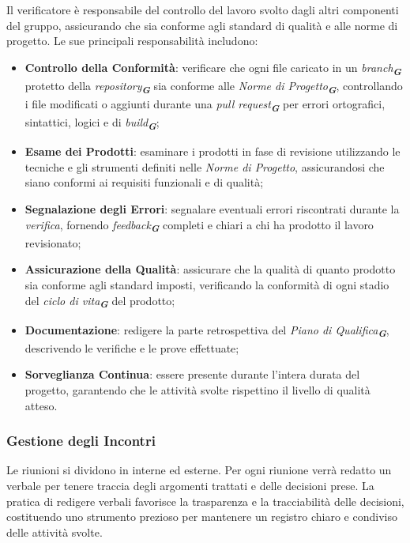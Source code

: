 Il verificatore è responsabile del controllo del lavoro svolto dagli altri componenti del gruppo, assicurando che sia conforme agli standard di qualità e alle norme di progetto. 
Le sue principali responsabilità includono:
\begin{itemize}
    \item \textbf{Controllo della Conformità}: verificare che ogni file caricato in un \emph{branch}\textsubscript{\textit{\textbf{G}}} protetto della \emph{repository}\textsubscript{\textit{\textbf{G}}} sia conforme alle \emph{Norme di Progetto}\textsubscript{\textit{\textbf{G}}}, controllando i file modificati o aggiunti durante una \emph{pull request}\textsubscript{\textit{\textbf{G}}} per errori ortografici, sintattici, logici e di \emph{build}\textsubscript{\textit{\textbf{G}}};
    \item \textbf{Esame dei Prodotti}: esaminare i prodotti in fase di revisione utilizzando le tecniche e gli strumenti definiti nelle \emph{Norme di Progetto}, assicurandosi che siano conformi ai requisiti funzionali e di qualità;
    \item \textbf{Segnalazione degli Errori}: segnalare eventuali errori riscontrati durante la \emph{verifica}, fornendo \emph{feedback}\textsubscript{\textit{\textbf{G}}} completi e chiari a chi ha prodotto il lavoro revisionato;
    \item \textbf{Assicurazione della Qualità}: assicurare che la qualità di quanto prodotto sia conforme agli standard imposti, verificando la conformità di ogni stadio del \emph{ciclo di vita}\textsubscript{\textit{\textbf{G}}} del prodotto;
    \item \textbf{Documentazione}: redigere la parte retrospettiva del \emph{Piano di Qualifica}\textsubscript{\textit{\textbf{G}}}, descrivendo le verifiche e le prove effettuate;
    \item \textbf{Sorveglianza Continua}: essere presente durante l’intera durata del progetto, garantendo che le attività svolte rispettino il livello di qualità atteso.
\end{itemize}

\subsubsection{Gestione degli Incontri}
Le riunioni si dividono in interne ed esterne. Per ogni riunione verrà redatto un verbale per tenere traccia degli argomenti trattati e delle decisioni prese. 
La pratica di redigere verbali favorisce la trasparenza e la tracciabilità delle decisioni, costituendo uno strumento prezioso per mantenere un registro chiaro e condiviso delle attività svolte.

